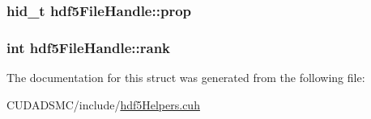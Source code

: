 \hypertarget{structhdf5_file_handle_a412d7866b73b0dc4f6aca7207fb33b46}{
\subsubsection[{prop}]{\setlength{\rightskip}{0pt plus 5cm}hid\+\_\+t hdf5\+File\+Handle\+::prop}}\label{structhdf5_file_handle_a412d7866b73b0dc4f6aca7207fb33b46}
\hypertarget{structhdf5_file_handle_aebdea3da56b253e892a18e5725507a4f}{
\subsubsection[{rank}]{\setlength{\rightskip}{0pt plus 5cm}int hdf5\+File\+Handle\+::rank}}\label{structhdf5_file_handle_aebdea3da56b253e892a18e5725507a4f}


The documentation for this struct was generated from the following file\+:\begin{DoxyCompactItemize}
\item 
C\+U\+D\+A\+D\+S\+M\+C/include/\hyperlink{hdf5_helpers_8cuh}{hdf5\+Helpers.\+cuh}\end{DoxyCompactItemize}
